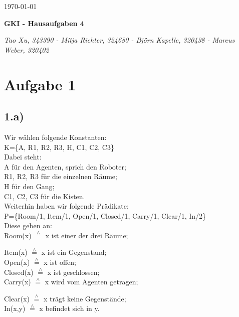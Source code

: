 \documentclass[a4paper]{article}
\newcommand{\entspricht}{\stackrel{\scriptscriptstyle\wedge}{=}}
\begin{document}
  \begin{flushright}
    \today
  \end{flushright}
  \begin{center}
    \Large\textbf{{GKI - Hausaufgaben 4}}\\
  \end{center}

  \begin{center}
        \large\textsl{Tao Xu, 343390 - Mitja Richter, 324680 - Björn Kapelle, 320438 - Marcus Weber, 320402}\\
  \end{center}
\section*{Aufgabe 1}
\subsection*{1.a)}
Wir w\"ahlen folgende Konstanten:\\

K=\{A, R1, R2, R3, H, C1, C2, C3\}\\

Dabei steht:\\
A f\"ur den Agenten, sprich den Roboter;\\
R1, R2, R3 f\"ur die einzelnen R\"aume;\\
H f\"ur den Gang;\\
C1, C2, C3 f\"ur die Kisten.\\

Weiterhin haben wir folgende Pr\"adikate:\\

P=\{Room/1, Item/1, Open/1, Closed/1, Carry/1, Clear/1, In/2\}\\

Diese geben an:\\
Room(x) $\entspricht$ x ist einer der drei R\"aume;

Item(x) $\entspricht$ x ist ein Gegenstand;\\
Open(x) $\entspricht$ x ist offen;\\
Closed(x) $\entspricht$ x ist geschlossen;\\
Carry(x) $\entspricht$ x wird vom Agenten getragen;

Clear(x) $\entspricht$ x tr\"agt keine Gegenst\"ande;\\
In(x,y) $\entspricht$ x befindet sich in y.\\
\end{document}
